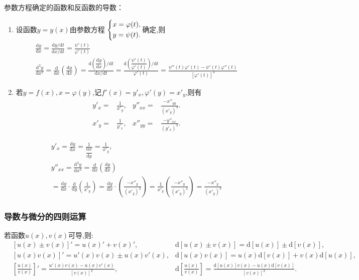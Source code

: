 参数方程确定的函数和反函数的导数：
\begin{enumerate}
    \item 设函数$y=y(x)$由参数方程
$\begin{dcases}
    x=\varphi (t),\\
    y=\psi (t).
\end{dcases}$确定,则
\begin{gather*}
    \frac{\mathrm{d} y}{\mathrm{d} x} =\frac{\mathrm{d} y/\mathrm{d} t}{\mathrm{d} x/\mathrm{d} t}=\frac{\psi '(t)}{\varphi '(t)}\\
    \frac{\mathrm{d}^2 y}{\mathrm{d} x^2} 
    =\frac{\mathrm{d}}{\mathrm{d} x} \left(\frac{\mathrm{d} y}{\mathrm{d} x}\right)
    =\frac{\mathrm{d} \left(\dfrac{\mathrm{d} y}{\mathrm{d} x}\right) /\mathrm{d}t}{\mathrm{d} x/\mathrm{d}t}
    =\frac{\mathrm{d} \left(\dfrac{\psi '(t)}{\varphi '(t)}\right) /\mathrm{d}t}{\varphi '(t)}
    =\frac{\psi ''(t)\varphi '(t)-\psi '(t)\varphi ''(t)}{\left[\varphi '(t)\right]^3 }
\end{gather*}
\item 若$y=f(x),x=\varphi (y)$,记$f'(x)=y'_x,\varphi '(y)=x'_y$,则有
\begin{align*}
    y'_x=&\frac{1}{x'_y},&
    y''_{xx}=&\frac{-x''_{yy}}{\left(x'_y\right) ^3}.\\
    x'_y=&\frac{1}{y'_x},&
    x''_{yy}=&\frac{-y''_{xx}}{\left(y'_x\right) ^3}.
\end{align*}
\begin{prf}
\begin{gather*}
    y'_x=\frac{\mathrm{d} y}{\mathrm{d} x}=\frac{1}{\dfrac{\mathrm{d} x}{\mathrm{d} y}}=\frac{1}{x'_y},\\
    y''_{xx}=\frac{\mathrm{d}^2 y}{\mathrm{d} x^2} 
    =\frac{\mathrm{d}}{\mathrm{d} x} \left(\frac{\mathrm{d} y}{\mathrm{d} x}\right)\\
    =\frac{\mathrm{d} y}{\mathrm{d} x}\cdot \frac{\mathrm{d}}{\mathrm{d} y} \left(\frac{1}{x'_y}\right) 
    =\frac{\mathrm{d} y}{\mathrm{d} x}\cdot \left(\frac{-x''_y}{(x'_y)^2}\right) 
    =\frac{1}{x'_y}\left(\frac{-x''_y}{(x'_y)^2}\right) 
    =\frac{-x''_y}{(x'_y)^3}
\end{gather*}
\end{prf}
\end{enumerate}
\subsubsection{导数与微分的四则运算}
若函数$u(x),v(x)$可导,则:
\begin{align*}
    &\left[u(x)\pm v(x)\right] '=u(x)'+v(x)',&\mathrm{d}\left[u(x)\pm v(x)\right] =\mathrm{d}\left[u(x)\right] \pm \mathrm{d}\left[v(x)\right],\\
    &\left[u(x)v(x)\right]' =u'(x)v(x)\pm u(x)v'(x),&\mathrm{d}\left[u(x)v(x)\right] =u(x)\mathrm{d}\left[v(x)\right] +v(x)\mathrm{d}\left[u(x)\right],\\
    &\left[\frac{u(x)}{v(x)}\right]'=\frac{u'(x)v(x)-u(x)v'(x)}{\left[v(x)\right] ^2},&\mathrm{d}\left[\frac{u(x)}{v(x)}\right]=\frac{\mathrm{d}\left[u(x)\right] v(x)-u(x)\mathrm{d}\left[v(x)\right] }{\left[v(x)\right] ^2}.
\end{align*}
